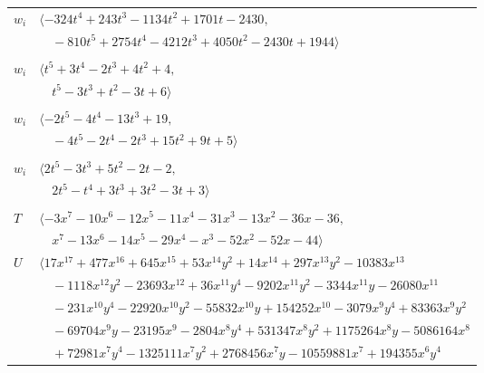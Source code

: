 \documentclass[11pt]{article}
\begin{document}
\begin{longtable}{@{}ll@{}}
$w_i$ & $\langle -324t^{4}+243t^{3}-1134t^{2}+1701t-2430,$\\
 & $\quad -810t^{5}+2754t^{4}-4212t^{3}+4050t^{2}-2430t+1944\rangle$\\
\addlinespace[2pt]
\multicolumn{2}{@{}p{0.97\textwidth}@{}}{$i=33$, $D_i=1$, $\rho_{ij}$: $2{:}1, \allowbreak 5{:}1, \allowbreak 7{:}2, \allowbreak 11{:}2, \allowbreak 19{:}1, \allowbreak 21{:}2, \allowbreak 29{:}2$}\\
$w_i$ & $\langle t^{5}+3t^{4}-2t^{3}+4t^{2}+4,$\\
 & $\quad t^{5}-3t^{3}+t^{2}-3t+6\rangle$\\
\addlinespace[2pt]
\multicolumn{2}{@{}p{0.97\textwidth}@{}}{$i=34$, $D_i=1$, $\rho_{ij}$: $0{:}1, \allowbreak 1{:}2, \allowbreak 2{:}2, \allowbreak 12{:}2, \allowbreak 16{:}1, \allowbreak 25{:}2, \allowbreak 27{:}1, \allowbreak 28{:}1, \allowbreak 31{:}2$}\\
$w_i$ & $\langle -2t^{5}-4t^{4}-13t^{3}+19,$\\
 & $\quad -4t^{5}-2t^{4}-2t^{3}+15t^{2}+9t+5\rangle$\\
\addlinespace[2pt]
\multicolumn{2}{@{}p{0.97\textwidth}@{}}{$i=35$, $D_i=1$, $\rho_{ij}$: $0{:}1, \allowbreak 3{:}1, \allowbreak 8{:}1, \allowbreak 13{:}1, \allowbreak 20{:}2, \allowbreak 21{:}2, \allowbreak 23{:}2$}\\
$w_i$ & $\langle 2t^{5}-3t^{3}+5t^{2}-2t-2,$\\
 & $\quad 2t^{5}-t^{4}+3t^{3}+3t^{2}-3t+3\rangle$\\
\addlinespace[2pt]
\multicolumn{2}{@{}p{0.97\textwidth}@{}}{$i=36$, $D_i=16$, $\rho_{ij}$: $4{:}1, \allowbreak 25{:}1, \allowbreak 27{:}2, \allowbreak 32{:}2$}\\
$T$ & $\langle -3x^{7}-10x^{6}-12x^{5}-11x^{4}-31x^{3}-13x^{2}-36x-36,$\\
 & $\quad x^{7}-13x^{6}-14x^{5}-29x^{4}-x^{3}-52x^{2}-52x-44\rangle$\\
$U$ & $\langle 17x^{17}+477x^{16}+645x^{15}+53x^{14}y^{2}+14x^{14}+297x^{13}y^{2}-10383x^{13}$\\
 & $\quad -1118x^{12}y^{2}-23693x^{12}+36x^{11}y^{4}-9202x^{11}y^{2}-3344x^{11}y-26080x^{11}$\\
 & $\quad -231x^{10}y^{4}-22920x^{10}y^{2}-55832x^{10}y+154252x^{10}-3079x^{9}y^{4}+83363x^{9}y^{2}$\\
 & $\quad -69704x^{9}y-23195x^{9}-2804x^{8}y^{4}+531347x^{8}y^{2}+1175264x^{8}y-5086164x^{8}$\\
 & $\quad +72981x^{7}y^{4}-1325111x^{7}y^{2}+2768456x^{7}y-10559881x^{7}+194355x^{6}y^{4}$\\

\end{longtable}
\end{document}
